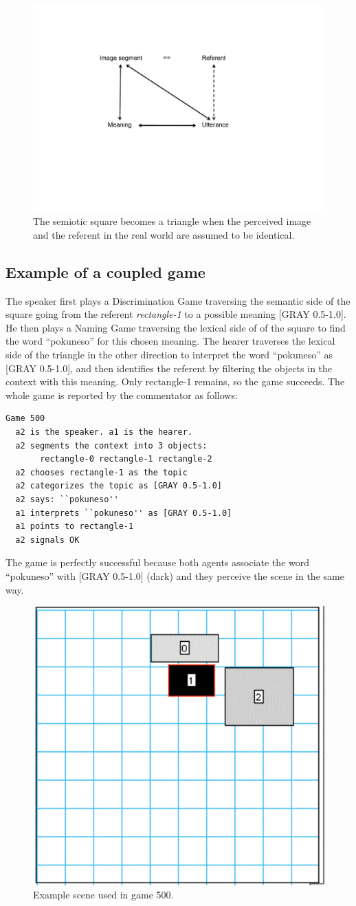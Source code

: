 \begin{figure}[htbp]
  \centerline{\includegraphics[width=.50\textwidth]{chap6/figs/square6}}
\caption{\label{square6} The semiotic square becomes
a triangle when the perceived image and the referent in the
real world are assumed to be identical.} 
\end{figure}

\subsection{Example of a coupled game}

The speaker first plays a Discrimination Game traversing the 
semantic side of the square going from the referent 
{\itshape rectangle-1} to a possible meaning [GRAY 0.5-1.0]. 
He then plays a Naming Game traversing the lexical side of 
of the square to find the word ``pokuneso'' for this chosen meaning. 
The hearer traverses the lexical side of the triangle in 
the other direction to interpret the word ``pokuneso'' as
{}[GRAY 0.5-1.0], and then identifies the referent by 
filtering the objects in the context with this meaning. 
Only rectangle-1 remains, so the game succeeds. 
The whole game is reported by the commentator as follows: 
\begin{verbatim}
Game 500
  a2 is the speaker. a1 is the hearer. 
  a2 segments the context into 3 objects: 
       rectangle-0 rectangle-1 rectangle-2
  a2 chooses rectangle-1 as the topic 
  a2 categorizes the topic as [GRAY 0.5-1.0]
  a2 says: ``pokuneso''
  a1 interprets ``pokuneso'' as [GRAY 0.5-1.0]
  a1 points to rectangle-1
  a2 signals OK 
\end{verbatim}
The game is perfectly successful because both 
agents associate the word ``pokuneso'' with 
{}[GRAY 0.5-1.0] (dark) and they perceive the scene 
in the same way.


\begin{figure}[htbp]
  \centerline{\includegraphics[width=.40\textwidth]{chap6/figs/recscene}}
\caption{\label{rect1} Example scene used
in game 500.}
\end{figure}



